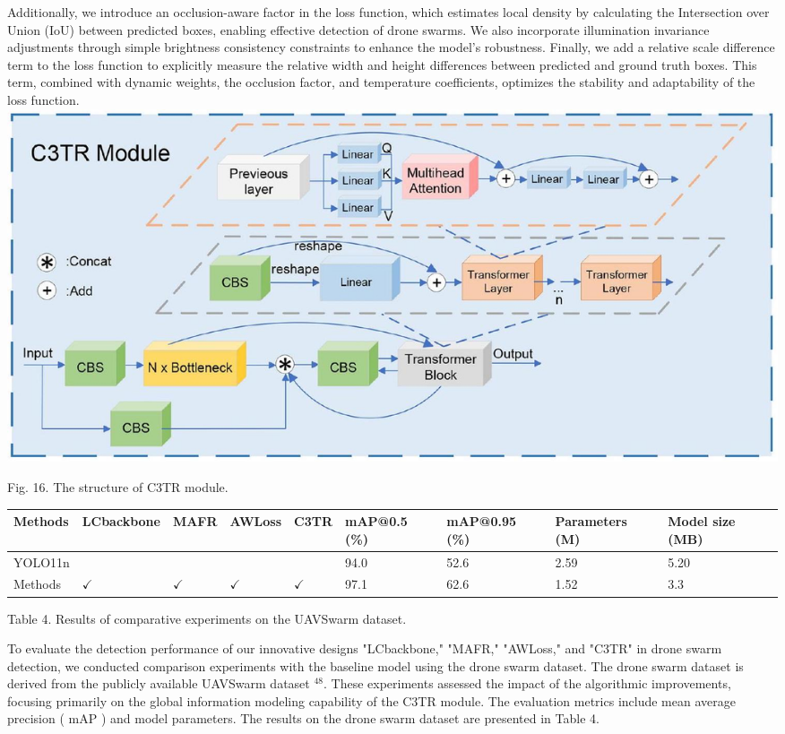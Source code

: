 \documentclass{article}
\begin{document}
Additionally, we introduce an occlusion-aware factor in the loss function, which estimates local density by calculating the Intersection over Union (IoU) between predicted boxes, enabling effective detection of drone swarms. We also incorporate illumination invariance adjustments through simple brightness consistency constraints to enhance the model's robustness. Finally, we add a relative scale difference term to the loss function to explicitly measure the relative width and height differences between predicted and ground truth boxes. This term, combined with dynamic weights, the occlusion factor, and temperature coefficients, optimizes the stability and adaptability of the loss function.\\
\includegraphics[max width=\textwidth, center]{2025_08_05_34f8389150f57116e76bg-17}

Fig. 16. The structure of C3TR module.

\begin{center}
\begin{tabular}{|l|l|l|l|l|l|l|l|l|}
\hline
Methods & LCbackbone & MAFR & AWLoss & C3TR & mAP@0.5 (\%) & mAP@0.95 (\%) & Parameters (M) & Model size (MB) \\
\hline
YOLO11n &  &  &  &  & 94.0 & 52.6 & 2.59 & 5.20 \\
\hline
Methods & $\checkmark$ & $\checkmark$ & $\checkmark$ & $\checkmark$ & 97.1 & 62.6 & 1.52 & 3.3 \\
\hline
\end{tabular}
\end{center}

Table 4. Results of comparative experiments on the UAVSwarm dataset.

To evaluate the detection performance of our innovative designs "LCbackbone," "MAFR," "AWLoss," and "C3TR" in drone swarm detection, we conducted comparison experiments with the baseline model using the drone swarm dataset. The drone swarm dataset is derived from the publicly available UAVSwarm dataset ${ }^{48}$. These experiments assessed the impact of the algorithmic improvements, focusing primarily on the global information modeling capability of the C3TR module. The evaluation metrics include mean average precision ( mAP ) and model parameters. The results on the drone swarm dataset are presented in Table 4.
\end{document}
